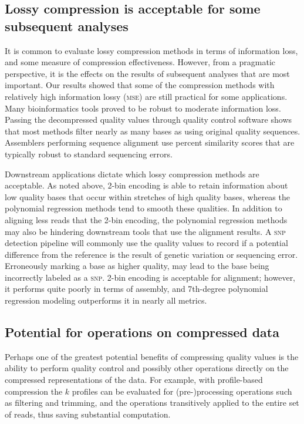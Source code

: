 \documentclass{bioinfo}
\begin{document}
\subsection{Lossy compression is acceptable for some subsequent  
analyses}

It is common to evaluate lossy compression methods in terms of
information loss, and some measure of compression effectiveness.
However, from a pragmatic perspective, it is the effects on the
results of subsequent analyses that are most important. Our results
showed that some of the compression methods with relatively high
information lossy (\textsc{mse}) are still practical for some
applications. Many bioinformatics tools proved to be robust to
moderate information loss. Passing the decompressed quality values
through quality control software shows that most methods filter nearly
as many bases as using original quality sequences. Assemblers
performing sequence alignment use percent similarity scores that are
typically robust to standard sequencing errors.

Downstream applications dictate which lossy compression methods are
acceptable. As noted above, 2-bin encoding is able to retain
information about low quality bases that occur within stretches of
high quality bases, whereas the polynomial regression methods tend to
smooth these qualities. In addition to aligning less reads that the
2-bin encoding, the polynomial regression methods may also be
hindering downstream tools that use the alignment results. A
\textsc{snp} detection pipeline will commonly use the quality values
to record if a potential difference from the reference is the result
of genetic variation or sequencing error. Erroneously marking a base
as higher quality, may lead to the base being incorrectly labeled as a
\textsc{snp}. 2-bin encoding is acceptable for alignment; however, it
performs quite poorly in terms of assembly, and 7th-degree polynomial
regression modeling outperforms it in nearly all metrics.

\subsection{Potential for operations on compressed data}

Perhaps one of the greatest potential benefits of compressing quality
values is the ability to perform quality control and possibly other
operations directly on the compressed representations of the data. For
example, with profile-based compression the $k$ profiles can be
evaluated for (pre-)processing operations such as filtering and
trimming, and the operations transitively applied to the entire set of
reads, thus saving substantial computation.
\end{document}
